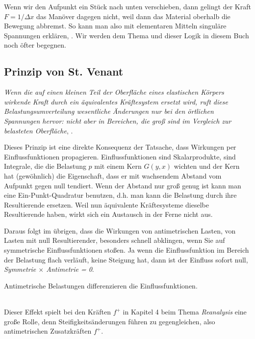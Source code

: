 Wenn wir den Aufpunkt ein St\"{u}ck nach unten verschieben, dann gelingt der Kraft $F = 1/\Delta x$ das Man\"{o}ver dagegen nicht, weil dann das Material oberhalb die Bewegung abbremst. So kann man also mit elementaren Mitteln singul\"{a}re Spannungen erkl\"{a}ren, \cite{HaJa2}. Wir werden dem Thema und dieser Logik in diesem Buch noch \"{o}fter begegnen.


{\textcolor{sectionTitleBlue}{\section{Prinzip von St. Venant}}}
{\em \glq \!Wenn die auf einen kleinen Teil der Oberfl\"{a}che eines elastischen K\"{o}rpers wirkende Kraft durch ein \"{a}quivalentes Kr\"{a}ftesystem ersetzt wird, ruft diese Belastungsumverteilung wesentliche \"{A}nderungen nur bei den \"{o}rtlichen Spannungen hervor: nicht aber in Bereichen, die gro{\ss} sind im Vergleich zur belasteten Oberfl\"{a}che\grq\/}, \cite{Wiki1}.

Dieses Prinzip ist eine direkte Konsequenz der Tatsache, dass Wirkungen per Einflussfunktionen propagieren. Einflussfunktionen sind Skalarprodukte, sind Integrale, die die Belastung $p$ mit einem Kern $G(y,x)$ wichten und der Kern hat (gew\"{o}hnlich) die Eigenschaft, dass er mit wachsendem Abstand vom Aufpunkt gegen null tendiert. Wenn der Abstand nur gro{\ss} genug ist kann man eine Ein-Punkt-Quadratur benutzen, d.h. man kann die Belastung durch ihre Resultierende ersetzen. Weil nun \"{a}quivalente Kr\"{a}ftesysteme dieselbe Resultierende haben, wirkt sich ein Austausch in der Ferne nicht aus.

Daraus folgt im \"{u}brigen, dass die Wirkungen von antimetrischen Lasten, von Lasten mit null Resultierender, besonders schnell abklingen, wenn Sie auf symmetrische Einflussfunktionen sto{\ss}en. Ja wenn die Einflussfunktion im Bereich der Belastung \glq flach\grq{} verl\"{a}uft, keine Steigung hat, dann ist der Einfluss sofort null, {\em Symmetrie $\times$ Antimetrie = 0\/}. \\

\hspace*{-12pt}\colorbox{highlightBlue}{\parbox{0.98\textwidth}{Antimetrische Belastungen \glq differenzieren\grq{} die Einflussfunktionen.}}\\

Dieser Effekt spielt bei den Kr\"{a}ften $f^+ $ in Kapitel 4 beim Thema {\em Reanalysis\/} eine gro{\ss}e Rolle, denn Steifigkeits\"{a}nderungen f\"{u}hren zu gegengleichen, also antimetrischen Zusatzkr\"{a}ften $f^+$.

